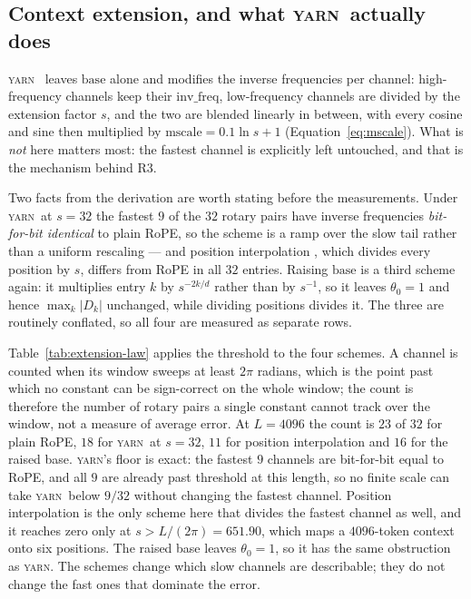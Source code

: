\documentclass{article}
\theoremstyle{plain}
\theoremstyle{remark}
\newcommand{\yarn}{\textsc{yarn}}
\newcommand{\invf}{\mathrm{inv\_freq}}
\begin{document}
\subsection{Context extension, and what \yarn\ actually does}
\label{app:extension-law}

\yarn\ \citep{peng2023yarn} leaves $\mathrm{base}$ alone and modifies the
inverse frequencies per channel: high-frequency channels keep their $\invf$,
low-frequency channels are divided by the extension factor $s$, and the two
are blended linearly in between, with every cosine and sine then multiplied by
$\mathrm{mscale} = 0.1\ln s + 1$ (Equation~\ref{eq:mscale}). What is
\emph{not} here matters most: the fastest channel is explicitly left
untouched, and that is the mechanism behind R3.

Two facts from the derivation are worth stating before the measurements.
Under \yarn\ at $s = 32$ the fastest $9$ of the $32$ rotary pairs have inverse
frequencies \emph{bit-for-bit identical} to plain RoPE, so the scheme is a
ramp over the slow tail rather than a uniform rescaling --- and position
interpolation \citep{chen2023positionalinterp}, which divides every position
by $s$, differs from RoPE in all $32$ entries. Raising $
\mathrm{base}$ is a third scheme again: it multiplies entry $k$ by
$s^{-2k/d}$ rather than by $s^{-1}$, so it leaves $\theta_0 = 1$ and hence
$\max_k |D_k|$ unchanged, while dividing positions divides it. The three are
routinely conflated, so all four are measured as separate rows.

Table~\ref{tab:extension-law} applies the threshold to the four schemes. A
channel is counted when its window sweeps at least $2\pi$ radians, which is the
point past which no constant can be sign-correct on the whole window; the count
is therefore the number of rotary pairs a single constant cannot track over the
window, not a measure of average error. At $L=4096$ the count is $23$ of $32$ for
plain RoPE, $18$ for \yarn\ at $s=32$, $11$ for position interpolation and $16$
for the raised base. \yarn's floor is exact: the fastest $9$ channels are
bit-for-bit equal to RoPE, and all $9$ are already past threshold at this
length, so no finite scale can take \yarn\ below $9/32$ without changing the
fastest channel. Position interpolation is the only scheme here that divides the
fastest channel as well, and it reaches zero only at
$s > L/(2\pi) = 651.90$, which maps a $4096$-token context onto six positions.
The raised base leaves $\theta_0 = 1$, so it has the same obstruction as \yarn.
The schemes change which slow channels are describable; they do not change the
fast ones that dominate the error.
\end{document}
